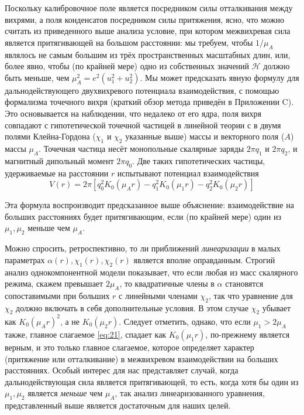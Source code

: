 Поскольку калибровочное поле является посредником силы отталкивания между 
вихрями, а поля конденсатов посредником силы притяжения, ясно, что можно 
считать из приведенного выше анализа условие, при котором межвихревая сила 
является притягивающей на большом расстоянии: мы требуем, чтобы \( 1/\mu_A \) 
являлось не самым большим из трёх пространственных масштабных длин, или, 
более явно, чтобы (по крайней мере) одно из собственных значений 
\( \mathcal{H} \) должно быть меньше, чем \( \mu_A^2 = e^2(u_1^2 + u_2^2) \). 
Мы может предсказать явную формулу для дальнодействующего двухвихревого 
потенциала взаимодействия, с помощью формализма точечного вихря \cite{bib:19} 
(краткий обзор метода приведён в Приложении C). Это основывается на 
наблюдении, что недалеко от его ядра, поля вихря совпадают с гипотетической 
точечной частицей в линейной теории с в двумя полями Клейна-Гордона 
(\( \chi_1 \) и \( \chi_2 \) указанные выше) массы и векторного поля (\( A \)) 
массы \( \mu_A \). Точечная частица несёт монопольные скалярные заряды 
\( 2\pi q_1 \) и \( 2\pi q_2 \), и магнитный дипольный момент \( 2\pi q_0 \). 
Две таких гипотетических частицы, удерживаемые на расстоянии \( r \) 
испытывают потенциал взаимодействия
\begin{equation}
    V(r) = 2\pi\left[ q_0^2 K_0(\mu_A r) - q_1^2 K_0(\mu_1 r) - 
        q_2^2 K_0(\mu_2 r) \right]
    \label{eq:22}
\end{equation}

Эта формула воспроизводит предсказанное выше объяснение: взаимодействие на 
больших расстояниях будет притягивающим, если (по крайней мере) один из 
\( \mu_1, \mu_2 \) меньше чем \( \mu_A \). 

Можно спросить, ретроспективно, то ли приближений \textit{линеаризации} в 
малых параметрах \( \alpha(r), \chi_1(r), \chi_2(r) \) является вполне 
оправданным. Строгий анализ однокомпонентной модели \cite{bib:20} показывает, 
что если любая из масс скалярного режима, скажем превышает \( 2\mu_A \), то 
квадратичные члены в \( \alpha \) становятся сопоставимыми при больших \( r \) 
с линейными членами \( \chi_2 \), так что уравнение для \( \chi_2 \) должно 
включать в себя дополнительные условия. В этом случае \( \chi_2 \) убывает как 
\( K_0(\mu_A r)^2 \), а не \( K_0(\mu_2 r) \). Следует отметить, однако, что 
если \( \mu_1 > 2\mu_A \) также, главное слагаемое \eqref{eq:21}, спадает как 
\( K_0(\mu_1 r) \), по-прежнему является верным, и это только главное 
слагаемое, которое определяет характер (притяжение или отталкивание) в 
межвихревом взаимодействии на больших расстояниях. Особый интерес для нас 
представляет случай, когда дальнодействующая сила является притягивающей, то 
есть, когда хотя бы один из \( \mu_1, \mu_2 \) является \textit{меньше} чем 
\( \mu_A \), так анализ линеаризованного уравнения, представленный выше 
является достаточным для наших целей.

